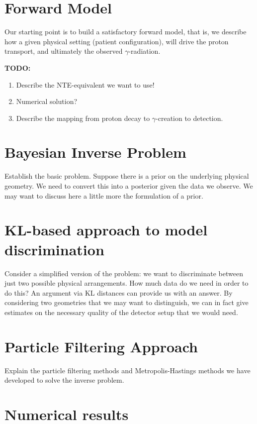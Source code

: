 \documentclass[lettersize,journal]{IEEEtran}
\begin{document}
\section{Forward Model}

Our starting point is to build a satisfactory forward model, that is, we describe how a given physical setting (patient configuration), will drive the proton transport, and ultimately the observed $\gamma$-radiation.

{\bf TODO:}
\begin{enumerate}
\item Describe the NTE-equivalent we want to use!
\item Numerical solution?
\item Describe the mapping from proton decay to $\gamma$-creation to detection.
\end{enumerate}


\section{Bayesian Inverse Problem}

Establish the basic problem. Suppose there is a prior on the underlying physical geometry. We need to convert this into a posterior given the data we observe. We may want to discuss here a little more the formulation of a prior.

\section{KL-based approach to model discrimination}

Consider a simplified version of the problem: we want to discriminate between just two possible physical arrangements. How much data do we need in order to do this? An argument via KL distances can provide us with an answer. By considering two geometries that we may want to distinguish, we can in fact give estimates on the necessary quality of the detector setup that we would need.

\section{Particle Filtering Approach}

Explain the particle filtering methods and Metropolis-Hastings methods we have developed to solve the inverse problem.

\section{Numerical results}
\end{document}
